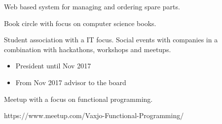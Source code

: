 \documentclass[10pt,a4paper,ragged2e,withhyper]{altacv}
\begin{document}
\begin{paracol}{2}
  

\divider


Web based system for managing and ordering spare parts.

 









Book circle with focus on computer science books.

\divider


Student association with a IT focus. Social events with companies in a combination
with hackathons, workshops and meetups.

\begin{itemize}
\item President until Nov 2017
\item From Nov 2017 advisor to the board
\end{itemize}

\divider


Meetup with a focus on functional programming.

https://www.meetup.com/Vaxjo-Functional-Programming/

\medskip




\end{paracol}
\end{document}
